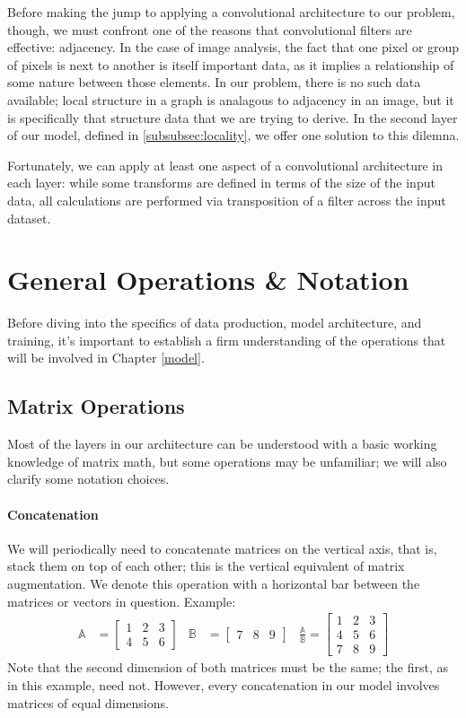 Before making the jump to applying a convolutional architecture to our problem, 
though, we must confront one of the reasons that convolutional filters are 
effective: adjacency. In the case of image analysis, the fact that one pixel or 
group of pixels is next to another is itself important data, as it implies a 
relationship of some nature between those elements. In our problem, there is no 
such data available; local structure in a graph is analagous to adjacency in an 
image, but it is specifically that structure data that we are trying to derive.  
In the second layer of our model, defined in \ref{subsubsec:locality}, we offer 
one solution to this dilemna.

Fortunately, we can apply at least one aspect of a convolutional architecture in 
each layer: while some transforms are defined in terms of the size of the input 
data, all calculations are performed via transposition of a filter across the 
input dataset.


\section{General Operations \& Notation}
Before diving into the specifics of data production, model architecture, and 
training, it's important to establish a firm understanding of the operations 
that will be involved in Chapter \ref{model}.

\subsection{Matrix Operations}
\label{subsec:matops}
Most of the layers in our architecture can be understood with a basic working 
knowledge of matrix math, but some operations may be unfamiliar; we will also 
clarify some notation choices.

\paragraph{Concatenation}
We will periodically need to concatenate matrices on the vertical axis, that is, 
stack them on top of each other; this is the vertical equivalent of matrix 
augmentation. We denote this operation with a horizontal bar between the 
matrices or vectors in question. Example:
\begin{align*}
	\mathbb{A} &= \begin{bmatrix}
		1 & 2 & 3\\
		4 & 5 & 6
	\end{bmatrix} &
	\mathbb{B} &= \begin{bmatrix}
		7 & 8 & 9
	\end{bmatrix} &
	\frac{\mathbb{A}}{\mathbb{B}} = \begin{bmatrix}
		1 & 2 & 3\\
		4 & 5 & 6\\
		7 & 8 & 9
	\end{bmatrix}
\end{align*}
Note that the second dimension of both matrices must be the same; the first, as 
in this example, need not. However, every concatenation in our model involves 
matrices of equal dimensions.


